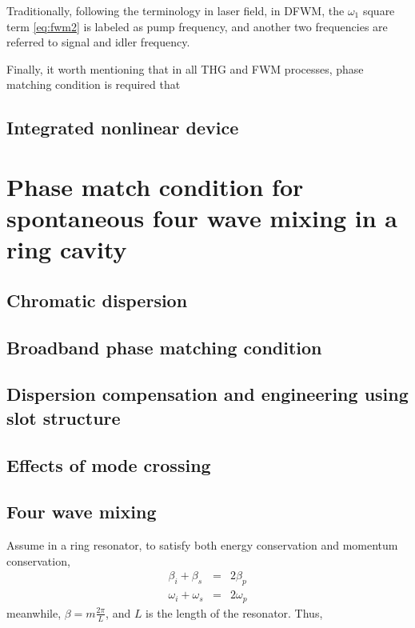 \documentclass[final]{kuee_en}
\begin{document}
\begin{itemize}
Traditionally, following the terminology in laser field, in DFWM, the $\omega_1$ square term \autoref{eq:fwm2} is labeled as pump frequency, and another two frequencies are referred to signal and idler frequency.
\end{itemize}

Finally, it worth mentioning that in all THG and FWM processes, phase matching condition is required that 




\section{Integrated nonlinear device}


\chapter{Phase match condition for spontaneous four wave mixing in a ring cavity }
\section{Chromatic dispersion}

\section{Broadband phase matching condition}
\section{Dispersion compensation and engineering using slot structure}
\section{Effects of mode crossing}
\section{Four wave mixing}


Assume in a ring resonator, to satisfy both energy conservation and momentum
conservation,
\begin{eqnarray*}
  \beta_i + \beta_s & = & 2 \beta_p\\
  \omega_i + \omega_s & = & 2 \omega_p
\end{eqnarray*}
meanwhile, $\beta = m \frac{2 \pi}{L}$, and $L$ is the length of the
resonator. Thus,
\end{document}
